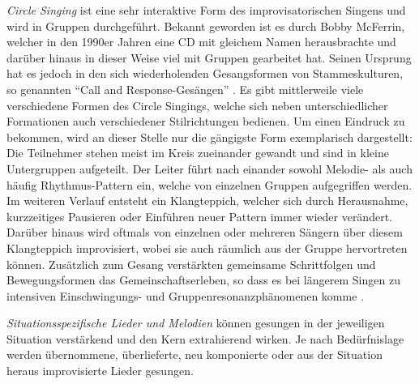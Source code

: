 \emph{Circle Singing} ist eine sehr interaktive Form des improvisatorischen Singens und wird in Gruppen durchgeführt. Bekannt geworden ist es durch Bobby McFerrin, welcher in den 1990er Jahren eine CD mit gleichem Namen herausbrachte und darüber hinaus in dieser Weise viel mit Gruppen gearbeitet hat. Seinen Ursprung hat es jedoch in den sich wiederholenden Gesangsformen von Stammeskulturen, so genannten "`Call and Response-Gesängen"' \autocite[vgl.][280]{bossinger2006}. Es gibt mittlerweile viele verschiedene Formen des Circle Singings, welche sich neben unterschiedlicher Formationen auch verschiedener Stilrichtungen bedienen. Um einen Eindruck zu bekommen, wird an dieser Stelle nur die gängigste Form exemplarisch dargestellt: Die Teilnehmer stehen meist im Kreis zueinander gewandt und sind in kleine Untergruppen aufgeteilt. Der Leiter führt nach einander sowohl Melodie- als auch häufig Rhythmus-Pattern ein, welche von einzelnen Gruppen aufgegriffen werden. Im weiteren Verlauf entsteht ein Klangteppich, welcher sich durch Herausnahme, kurzzeitiges Pausieren oder Einführen neuer Pattern immer wieder verändert. Darüber hinaus wird oftmals von einzelnen oder mehreren Sängern über diesem Klangteppich improvisiert, wobei sie auch räumlich aus der Gruppe hervortreten können. Zusätzlich zum Gesang verstärkten gemeinsame Schrittfolgen und Bewegungsformen das Gemeinschaftserleben, so dass es bei längerem Singen zu intensiven Einschwingungs- und Gruppenresonanzphänomenen komme \autocite[vgl.][281]{bossinger2006}.

\emph{Situationsspezifische Lieder und Melodien} können gesungen in der jeweiligen Situation verstärkend und den Kern extrahierend wirken. Je nach Bedürfnislage werden übernommene, überlieferte, neu komponierte oder aus der Situation heraus improvisierte Lieder gesungen.

